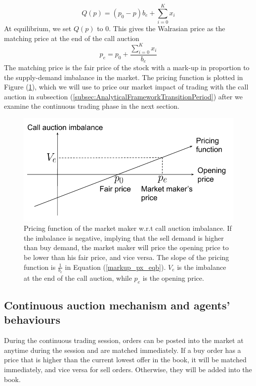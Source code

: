 \documentclass{article}
\begin{document}
\[
  Q(p) = (p_0 - p) b_e + \sum_{i=0}^K x_i
\]
At equilibrium, we set $Q(p)$ to 0. This gives the Walrasian price as the matching price at the end of the call auction
\begin{equation}\label{markup_px_eqb}
  p_e = p_0 + \frac{\sum_{i=0}^K x_i}{b_e}
\end{equation}
The matching price is the fair price of the stock with a mark-up in proportion to the supply-demand imbalance in the market. The pricing function is plotted in Figure (\ref{fig:mm_pricing_auction}), which we will use to price our market impact of trading with the call auction in subsection (\ref{subsec:AnalyticalFrameworkTransitionPeriod}) after we examine the continuous trading phase in the next section.

\begin{figure}[h]
  \includegraphics[width=\textwidth]{MMPricing}
  \caption{Pricing function of the market maker w.r.t call auction imbalance. If the imbalance is negative, implying that the sell demand is higher than buy demand, the market maker will price the opening price to be lower than his fair price, and vice versa. The slope of the pricing function is $\frac{1}{b_e}$ in Equation (\ref{markup_px_eqb}). $V_e$ is the imbalance at the end of the call auction, while $p_e$ is the opening price. }
  \label{fig:mm_pricing_auction}
\end{figure}

\subsection{Continuous auction mechanism and agents' behaviours}\label{subsec:AnalyticalFrameworkContinuousAuction}
During the continuous trading session, orders can be posted into the market at anytime during the session and are matched immediately. If a buy order has a price that is higher than the current lowest offer in the book, it will be matched immediately, and vice versa for sell orders. Otherwise, they will be added into the book.
\end{document}
